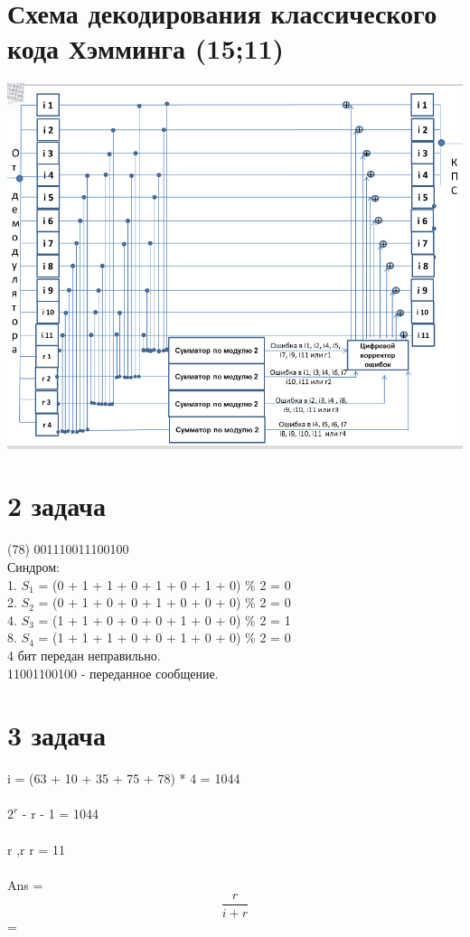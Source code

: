 \documentclass[12pt,onecolumn]{article}
\begin{document}
\section{Схема декодирования классического кода Хэмминга (15;11)}
\includegraphics[width=15cm]{img/img2.png}
\newpage
\section{2 задача}
(78) 001110011100100 \\
   Синдром:\\
   1. $S_1$ = (0 + 1 + 1 + 0 + 1 + 0 + 1 + 0) \% 2 = 0\\
   2. $S_2$ = (0 + 1 + 0 + 0 + 1 + 0 + 0 + 0) \% 2 = 0\\
   4. $S_3$ = (1 + 1 + 0 + 0 + 0 + 1 + 0 + 0) \% 2 = 1\\
   8. $S_4$ = (1 + 1 + 1 + 0 + 0 + 1 + 0 + 0) \% 2 = 0\\
   4 бит передан неправильно.\\
   11001100100 - переданное сообщение.
\newpage
\section{3 задача}
  i = (63 + 10 + 35 + 75 + 78) * 4 = 1044\\
  \\
  $2^r$ - r - 1 = 1044\\
  \\
  r  ,r \in {} \Rightarrow r  = 11\\
  \\
  Ans = $$\frac{r}{i + r}$$ =  \\
  \\
\newpage
\end{document}
